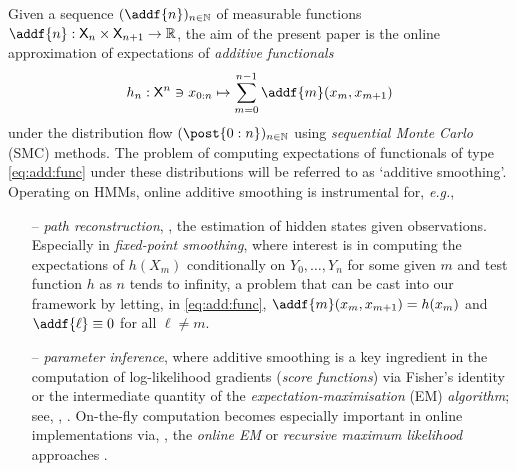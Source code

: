 Given a sequence $(\addf{n})_{n \in \nset}$ of measurable functions $\addf{n} : \Xset_n \times \Xset_{n + 1} \to \rset$, the aim of the present paper is the online approximation of expectations of \emph{additive functionals}   
\begin{equation} \label{eq:add:func}
    h_n : \Xset^n \ni x_{0:n} \mapsto \sum_{m = 0}^{n - 1} \addf{m}(x_m, x_{m + 1})
\end{equation}
under the distribution flow $(\post{0:n})_{n \in \nset}$ using \emph{sequential Monte Carlo} (SMC) methods. The problem of computing expectations of functionals of type \eqref{eq:add:func} under these distributions will be referred to as `additive smoothing'. Operating on HMMs, online additive smoothing is instrumental for, \emph{e.g.},    
\begin{enumerate}
    \item[--] \emph{path reconstruction}, \ie, the estimation of hidden states given observations. Especially in \emph{fixed-point smoothing}, where interest is in computing the expectations of $h(X_m)$ conditionally on $Y_0, \ldots, Y_n$ for some given $m$ and test function $h$ as $n$ tends to infinity, a problem that can be cast into our framework by letting, in \eqref{eq:add:func}, $\addf{m}(x_m, x_{m + 1}) = h(x_m)$ and $\addf{\ell} \equiv 0$ for all $\ell \neq m$. 
    \item[--] \emph{parameter inference}, where additive smoothing is a key ingredient in the computation of log-likelihood gradients (\emph{score functions}) via Fisher's identity or the intermediate quantity of the \emph{expectation-maximisation} (EM) \emph{algorithm}; see, \eg, \cite[Chapter~10]{Cappe:2005:IHM:1088883}. On-the-fly computation becomes especially important in online implementations via, \eg, the \emph{online EM} or \emph{recursive maximum likelihood} approaches \cite{cappe:2009,legland:mevel:1997}.  
 \end{enumerate}


